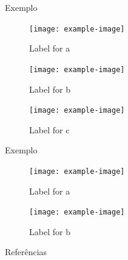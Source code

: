 \documentclass[portuguese,10pt]{beamer}
\begin{document}
\begin{frame}{Exemplo}
    \begin{figure}[ht]
        \begin{minipage}[b]{0.32\linewidth}
            \centering
            \texttt{[image: example-image]}
            \caption{Label for a}
            \label{fig:3a}
        \end{minipage}
        \hspace{\fill}
        \begin{minipage}[b]{0.32\linewidth}
            \centering
            \texttt{[image: example-image]}
            \caption{Label for b}
            \label{fig:3b}
        \end{minipage}
        \hspace{\fill}
        \begin{minipage}[b]{0.32\linewidth}
            \centering
            \texttt{[image: example-image]}
            \caption{Label for c}
            \label{fig:3c}
        \end{minipage}
    \end{figure}
\end{frame}

\begin{frame}{Exemplo}
    \begin{figure}[ht]
        \begin{minipage}[b]{0.49\linewidth}
            \centering
            \texttt{[image: example-image]}
            \caption{Label for a}
            \label{fig:2a}
        \end{minipage}
        \hspace{\fill}
        \begin{minipage}[b]{0.49\linewidth}
            \centering
            \texttt{[image: example-image]}
            \caption{Label for b}
            \label{fig:2b}
        \end{minipage}
    \end{figure}
\end{frame}

\begin{frame}{Referências}
  \printbibliography
\end{frame}
\end{document}

